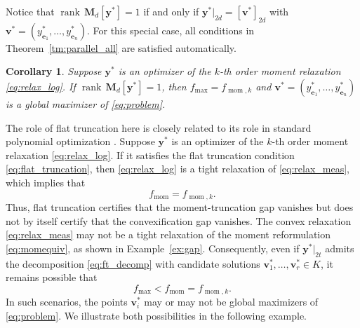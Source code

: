 \documentclass[pdflatex,sn-mathphys-num]{sn-jnl}%
\DeclareMathOperator{\rank}{rank}
\newcommand{\rd}[1]{{\color{red}#1}}
\newcommand{\vect}[1]{\boldsymbol{#1}}
\newcommand{\mat}[1]{\boldsymbol{#1}}
\newcommand{\ddd}{,\ldots,}
\theoremstyle{thmstyleone}%
\newtheorem{corollary}[theorem]{Corollary}
\theoremstyle{thmstyletwo}%
\theoremstyle{thmstylethree}%
\begin{document}
Notice that $\rank\, \mat{M}_d[\vect{y}^*] = 1$ if and only if $\vect{y}^*|_{2d} = [\vect{v}^*]_{2d}$ 
with $\vect{v}^* = (y^*_{\vect{e}_1}\ddd y^*_{\vect{e}_n})$. 
For this special case, all conditions in Theorem~\ref{tm:parallel_all} 
are satisfied automatically.

\begin{corollary}\label{cor:rank1}
	Suppose $\vect{y}^*$ is an optimizer of the $k$-th order moment relaxation
	\eqref{eq:relax_log}.
	If $\rank\, \mat{M}_d[\vect{y}^*] = 1$, then $f_{\max} = f_{\operatorname{mom},k}$
	and $\vect{v}^* = (y^*_{\vect{e}_1}\ddd y^*_{\vect{e}_n})$
	is a global maximizer of \eqref{eq:problem}.
\end{corollary}

\rd{The role of flat truncation here is closely related to its role
in standard polynomial optimization \cite{nie2013certifying}.}
Suppose $\vect{y}^*$ is an optimizer of the $k$-th order moment relaxation
\eqref{eq:relax_log}.
If it satisfies the flat truncation condition
\eqref{eq:flat_truncation}, then \eqref{eq:relax_log} is a tight
relaxation of \eqref{eq:relax_meas}, which implies that
\[
f_{\operatorname{mom}}=f_{\operatorname{mom},k}.
\]
\rd{Thus, flat truncation certifies that the moment-truncation gap vanishes but does
not by itself certify that the convexification gap vanishes.}
The convex relaxation \eqref{eq:relax_meas} may not be a tight
relaxation of the moment reformulation \eqref{eq:momequiv}, as shown
in Example~\ref{ex:gap}.
Consequently, even if $\vect{y}^*|_{2t}$ admits the decomposition
\eqref{eq:ft_decomp} with candidate solutions
$\vect{v}_1^*,\ldots,\vect{v}_r^*\in K$, it remains possible that
\[
f_{\max}<f_{\operatorname{mom}}
=f_{\operatorname{mom},k}.
\]
In such scenarios, the points $\vect{v}_i^*$ may or may not be global
maximizers of \eqref{eq:problem}.
We illustrate both possibilities in the following example.
\end{document}
